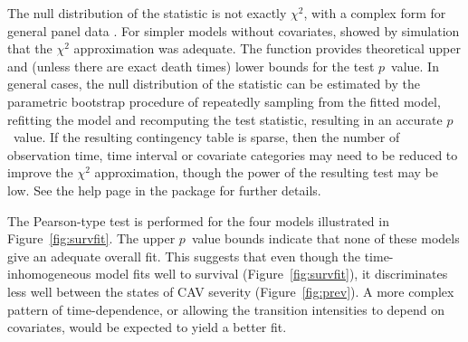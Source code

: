 \documentclass[article,shortnames]{jss}
\begin{document}
The null distribution of the statistic is not exactly $\chi^2$, with a
complex form for general panel data \citep{titman:asympnull}.  For
simpler models without covariates, \citet{ahf} showed by simulation
that the $\chi^2$ approximation was adequate.  The 
function provides theoretical upper and (unless there are exact death
times) lower bounds for the test $p$~value.  In general cases, the null
distribution of the statistic can be estimated by the parametric
bootstrap procedure of repeatedly sampling from the fitted model,
refitting the model and recomputing the test statistic, resulting in
an accurate $p$~value.  If the resulting contingency table is sparse,
then the number of observation time, time interval or covariate
categories may need to be reduced to improve the $\chi^2$
approximation, though the power of the resulting test may be low.  See
the  help page in the package for further details.

The Pearson-type test is performed for the four models illustrated in
Figure~\ref{fig:survfit}.  The upper $p$~value bounds indicate that none
of these models give an adequate overall fit.  This suggests that even
though the time-inhomogeneous model  fits well to
survival (Figure~\ref{fig:survfit}), it discriminates less well between
the states of CAV severity (Figure~\ref{fig:prev}).  A more complex
pattern of time-dependence, or allowing the transition intensities to
depend on covariates, would be expected to yield a better fit.
\end{document}
